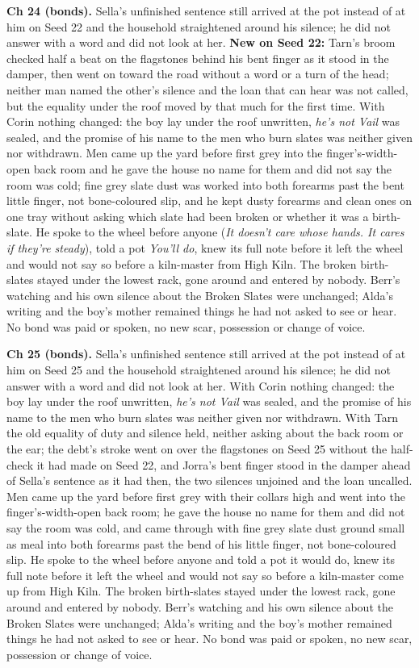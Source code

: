 \documentclass{design/chronicle}
\begin{document}
{\textbf{Ch 24 (bonds).} Sella’s unfinished sentence still arrived at the pot instead of at him on Seed 22 and the household straightened around his silence; he did not answer with a word and did not look at her. \textbf{New on Seed 22:} Tarn’s broom checked half a beat on the flagstones behind his bent finger as it stood in the damper, then went on toward the road without a word or a turn of the head; neither man named the other’s silence and the loan that can hear was not called, but the equality under the roof moved by that much for the first time. With Corin nothing changed: the boy lay under the roof unwritten, \emph{he’s not Vail} was sealed, and the promise of his name to the men who burn slates was neither given nor withdrawn. Men came up the yard before first grey into the finger’s-width-open back room and he gave the house no name for them and did not say the room was cold; fine grey slate dust was worked into both forearms past the bent little finger, not bone-coloured slip, and he kept dusty forearms and clean ones on one tray without asking which slate had been broken or whether it was a birth-slate. He spoke to the wheel before anyone (\emph{It doesn’t care whose hands. It cares if they’re steady}), told a pot \emph{You’ll do}, knew its full note before it left the wheel and would not say so before a kiln-master from High Kiln. The broken birth-slates stayed under the lowest rack, gone around and entered by nobody. Berr’s watching and his own silence about the Broken Slates were unchanged; Alda’s writing and the boy’s mother remained things he had not asked to see or hear. No bond was paid or spoken, no new scar, possession or change of voice.

\textbf{Ch 25 (bonds).} Sella’s unfinished sentence still arrived at the pot instead of at him on Seed 25 and the household straightened around his silence; he did not answer with a word and did not look at her. With Corin nothing changed: the boy lay under the roof unwritten, \emph{he’s not Vail} was sealed, and the promise of his name to the men who burn slates was neither given nor withdrawn. With Tarn the old equality of duty and silence held, neither asking about the back room or the ear; the debt’s stroke went on over the flagstones on Seed 25 without the half-check it had made on Seed 22, and Jorra’s bent finger stood in the damper ahead of Sella’s sentence as it had then, the two silences unjoined and the loan uncalled. Men came up the yard before first grey with their collars high and went into the finger’s-width-open back room; he gave the house no name for them and did not say the room was cold, and came through with fine grey slate dust ground small as meal into both forearms past the bend of his little finger, not bone-coloured slip. He spoke to the wheel before anyone and told a pot it would do, knew its full note before it left the wheel and would not say so before a kiln-master come up from High Kiln. The broken birth-slates stayed under the lowest rack, gone around and entered by nobody. Berr’s watching and his own silence about the Broken Slates were unchanged; Alda’s writing and the boy’s mother remained things he had not asked to see or hear. No bond was paid or spoken, no new scar, possession or change of voice.

}
\end{document}

